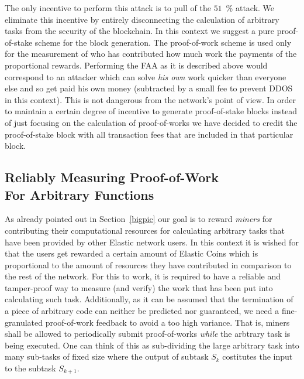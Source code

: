 \documentclass{sig-alternate}
\begin{document}
The only incentive to perform this attack is to pull of the $51$~\% attack.
We eliminate this incentive by entirely disconnecting the calculation of arbitrary tasks from the security of the blockchain. In this context we suggest a pure proof-of-stake scheme \cite{king2012ppcoin} for the block generation. The proof-of-work scheme is used only for the measurement of who has contributed how much work the payments of the proportional rewards.
Performing the FAA as it is described above would correspond to an attacker which can solve \emph{his own} work quicker than everyone else and so get paid his own money (subtracted by a small fee to prevent DDOS in this context). This is not dangerous from the network's point of view.
In order to maintain a certain degree of incentive to generate proof-of-stake blocks instead of just focusing on the calculation of proof-of-works we have decided to credit the proof-of-stake block with all transaction fees that are included in that particular block.

\subsection{Reliably Measuring Proof-of-Work\\For Arbitrary Functions}

As already pointed out in Section~\ref{bigpic} our goal is to reward \emph{miners} for contributing their computational resources for calculating arbitrary tasks that have been provided by other Elastic network users. In this context it is wished for that the users get rewarded a certain amount of Elastic Coins which is proportional to the amount of resources they have contributed in comparison to the rest of the network. For this to work, it is required to have a reliable and tamper-proof way to measure (and verify) the work that has been put into calculating such task. Additionally, as it can be assumed that the termination of a piece of arbitrary code can neither be predicted nor guaranteed, we need a fine-granulated proof-of-work feedback to avoid a too high variance. That is, miners shall be allowed to periodically submit proof-of-works \emph{while} the arbtrary task is being executed. One can think of this as sub-dividing the large arbitrary task into many sub-tasks of fixed size where the output of subtask $S_k$ costitutes the input to the subtask $S_{k+1}$.
\end{document}
